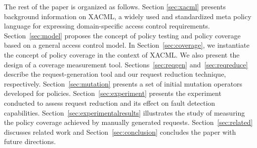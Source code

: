 
The rest of the paper is organized as follows. Section
\ref{sec:xacml} presents background information on XACML, a widely
used and standardized meta policy language for expressing
domain-specific access control requirements.
Section~\ref{sec:model} proposes the concept of policy testing and
policy coverage based on a general access control model. In
Section~\ref{sec:coverage}, we instantiate the concept of policy
coverage in the context of XACML. We also present the design of a
coverage measurement tool. Sections~\ref{sec:reqgen}
and~\ref{sec:reqreduce} describe the request-generation tool and
our request reduction technique, respectively.
Section~\ref{sec:mutation} presents a set of initial mutation
operators developed for policies. Section~\ref{sec:experiment}
presents the experiment conducted to assess request reduction and
its effect on fault detection capabilities.
Section~\ref{sec:experimentalresults} illustrates the study of
measuring the policy coverage achieved by manually generated
requests. Section~\ref{sec:related} discusses related work and
Section~\ref{sec:conclusion} concludes the paper with future
directions.

















\sloppy
